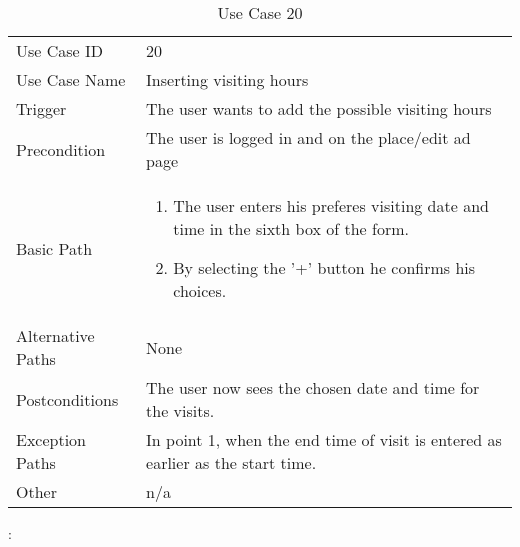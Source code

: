 \begin{table}[H]
\centering
\label{table-use-case-20}
\begin{tabular}{|p{3cm}|p{10cm}}
Use Case ID       & 20                                                      \\
Use Case Name     & Inserting visiting hours                            \\
Trigger           & The user wants to add the possible visiting hours \\
Precondition      & The user is logged in and on the place/edit ad page
\\
Basic Path        & \begin{enumerate}
\item		The user enters his preferes visiting date and time in the sixth box of
the form.
\item  		By selecting the '+' button he confirms his choices.
\end{enumerate} 
     \\
Alternative Paths & None                          \\
Postconditions    & The user now sees the chosen date and time for the visits.
\\
Exception Paths   & In point 1, when the end time of visit is entered as earlier
as the start time.
\\
Other             & n/a                                                                                                                                                                                                        
\end{tabular}
\caption{Use Case 20}:
\end{table}

